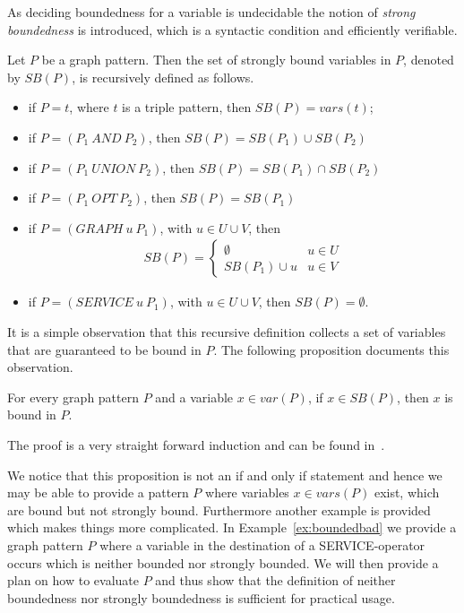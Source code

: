 As deciding boundedness for a variable is undecidable the notion of
\emph{strong boundedness} is introduced, which is a syntactic condition and
efficiently verifiable. 

\begin{definition}\label{def:strongboundedness}
Let $P$ be a graph pattern. Then the set of strongly bound variables in $P$,
denoted by $SB(P)$, is recursively defined as follows.

\begin{itemize}
\item if $P =t$, where $t$ is a triple pattern, then $SB(P) = vars(t)$;
\item if $P = (P_1 \ AND \ P_2)$, then $SB(P) = SB(P_1) \cup SB(P_2)$ 
\item if $P = (P_1  \ UNION \ P_2)$, then $SB(P) = SB(P_1) \cap SB(P_2)$ 
\item if $P = (P_1 \ OPT \ P_2)$, then $SB(P) = SB(P_1)$ 
\item if $P = (GRAPH \ u \ P_1)$, with $u \in U\cup V$, 
then\\
\begin{align*}
	SB(P) = 
\begin{cases} 
    \emptyset & \mbox{$u \in U$} \\
    SB(P_1) \cup u &\mbox{$u \in V$} 
\end{cases}
\end{align*}

\item if $P = (SERVICE \ u \ P_1)$, with $u \in U \cup V$, then $SB(P) = \emptyset$.
\end{itemize}
\end{definition}

It is a simple observation that this recursive definition collects a set of
variables that are guaranteed to be bound in $P$. The following proposition
documents this observation.

\begin{proposition}\label{sbinb}
For every graph pattern $P$ and a variable $x \in var(P)$, if $x \in SB(P)$,
then $x$ is bound in $P$.
\end{proposition}
The proof is a very straight forward induction and can be found
in~\cite[Appendix A]{BuilAranda20131}.

We notice that this proposition is not an if and only if statement and hence we may be
able to provide a pattern $P$ where variables $x \in vars(P)$ exist, which are bound but not
strongly bound. Furthermore another example is provided which makes things more
complicated. In Example~\ref{ex:boundedbad} we provide a graph pattern $P$ where a variable in the
destination of a SERVICE-operator occurs which is neither bounded nor strongly
bounded. We will then provide a plan on how to evaluate $P$ and thus show that
the definition of neither boundedness nor strongly boundedness is sufficient for
practical usage. 

